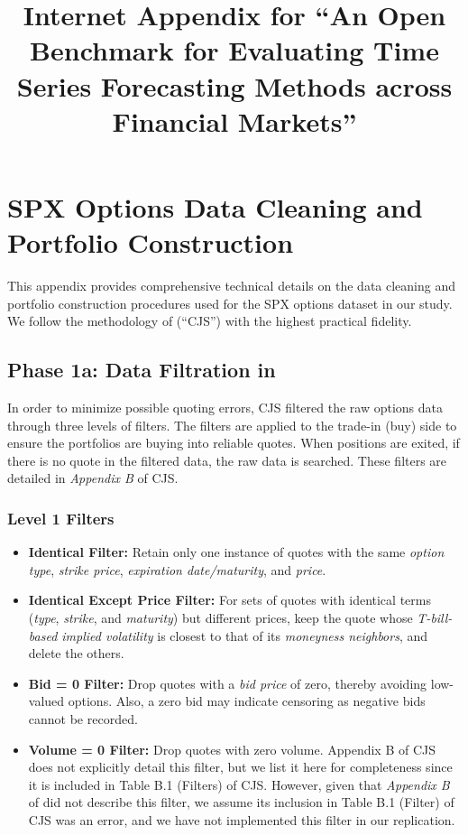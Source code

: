 \documentclass[11pt]{article}
\title{Internet Appendix for ``An Open Benchmark for Evaluating Time Series Forecasting Methods across Financial Markets''}
\author{}
\date{}
\begin{document}
\maketitle

\section{SPX Options Data Cleaning and Portfolio Construction}

This appendix provides comprehensive technical details on the data cleaning and portfolio construction procedures used for the SPX options dataset in our study. We follow the methodology of \citet{Constantinides2013} (``CJS'') with the highest practical fidelity.

\subsection{Phase 1a: Data Filtration in \citet{Constantinides2013}}

In order to minimize possible quoting errors, CJS filtered the raw options data through three levels of filters. The filters are applied to the trade-in (buy) side to ensure the portfolios are buying into reliable quotes. When positions are exited, if there is no quote in the filtered data, the raw data is searched. These filters are detailed in \textit{Appendix B} of CJS.



\subsubsection{Level 1 Filters}
\begin{itemize}
  \item \textbf{Identical Filter:} Retain only one instance of quotes with the same \textit{option type}, \textit{strike price}, \textit{expiration date/maturity}, and \textit{price}.
  \item \textbf{Identical Except Price Filter:} For sets of quotes with identical terms (\textit{type}, \textit{strike}, and \textit{maturity}) but different prices, keep the quote whose \textit{T-bill-based implied volatility} is closest to that of its \textit{moneyness neighbors}, and delete the others.
  \item \textbf{Bid = 0 Filter:} Drop quotes with a \textit{bid price} of zero, thereby avoiding low-valued options. Also, a zero bid may indicate censoring as negative bids cannot be recorded.
  \item \textbf{Volume = 0 Filter:} Drop quotes with zero volume. Appendix B of CJS does not explicitly detail this filter, but we list it here for completeness since it is included in Table B.1 (Filters) of CJS. However, given that \textit{Appendix B} of \citet{Constantinides2013} did not describe this filter, we assume its inclusion in Table B.1 (Filter) of CJS was an error, and we have not implemented this filter in our replication.
\end{itemize}
\end{document}
